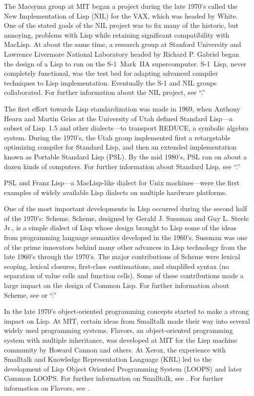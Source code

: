 The Macsyma group at MIT began a project during the late 1970's called the New Implementation of Lisp (NIL) for the VAX, which was headed by White.  One of the stated goals of the NIL project was to fix many of the historic, but annoying, problems with Lisp while retaining significant  compatibility with MacLisp.  At about the same time, a research group at Stanford University and Lawrence Livermore National Laboratory headed by Richard P. Gabriel began the design of a Lisp to run on the \hbox{S-1}~Mark~IIA supercomputer.  \hbox{S-1}~Lisp, never completely functional, was the test bed for adapting advanced compiler techniques to Lisp implementation.  Eventually the \hbox{S-1} and NIL groups collaborated. For further information about the NIL project, see ``{\NILReport}.''

The first effort towards Lisp standardization was made in 1969,  when Anthony Hearn and Martin Griss at the University of Utah  defined Standard Lisp---a subset of Lisp~1.5 and other dialects---to  transport REDUCE, a symbolic algebra system. During the 1970's, the Utah group implemented first a retargetable optimizing compiler for Standard Lisp, and then an extended implementation known as Portable Standard Lisp (PSL). By the mid 1980's, PSL ran on about a dozen kinds of computers. For further information about Standard Lisp, see ``{\StandardLispReport}.''

PSL and Franz Lisp---a MacLisp-like dialect for Unix machines---were  the first examples of widely available Lisp dialects on multiple  hardware platforms. 

One of the most important developments in Lisp occurred during the second half of the 1970's: Scheme. Scheme, designed by Gerald J. Sussman and Guy L. Steele Jr., is a simple dialect of Lisp whose design brought to Lisp some of the ideas from programming language semantics developed in the 1960's.  Sussman was one of the prime innovators behind many other advances in Lisp technology from the late 1960's through the 1970's. The major contributions of Scheme were lexical scoping, lexical closures, first-class continuations, and simplified syntax (no separation of value cells and function cells). Some of these contributions made a large impact on the design of Common Lisp. For further information about Scheme, see {\IEEEScheme} or ``{\RevisedCubedScheme}.''

In the late 1970's object-oriented programming concepts started to make a strong impact on Lisp.  At MIT, certain ideas from Smalltalk made their way into several widely used programming systems. Flavors, an object-oriented programming system with multiple inheritance,  was developed at MIT for the Lisp machine community by Howard Cannon and others. At Xerox, the experience with Smalltalk and  Knowledge Representation Language (KRL) led to the development of  Lisp Object Oriented Programming System (LOOPS) and later Common LOOPS. For further information on Smalltalk, see {\SmalltalkBook}. For further information on Flavors, see {\FlavorsPaper}.

